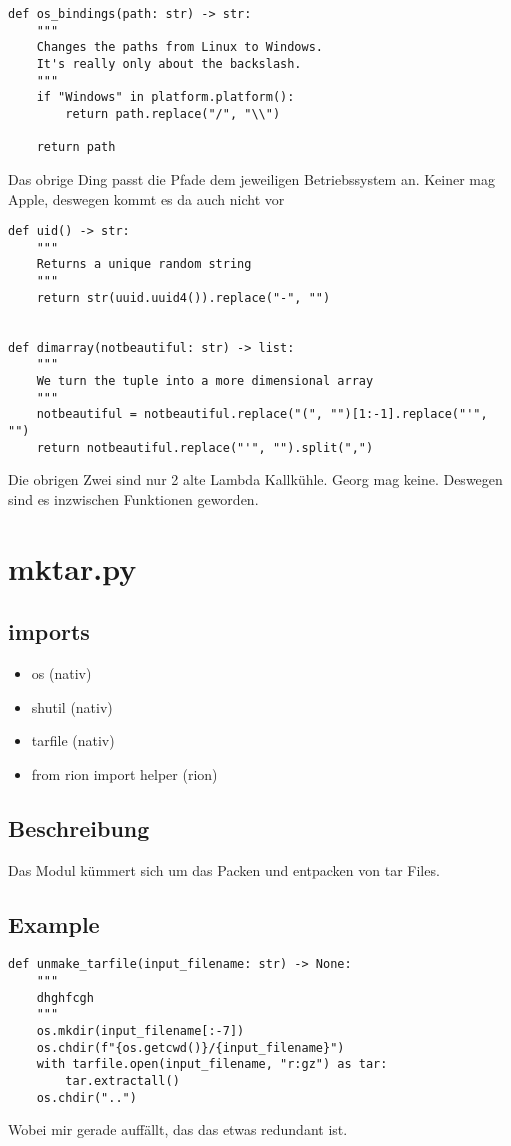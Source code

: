 \documentclass[fleqn,10pt]{olplainarticle}
\begin{document}
\begin{lstlisting}
def os_bindings(path: str) -> str:
    """
    Changes the paths from Linux to Windows.
    It's really only about the backslash.
    """
    if "Windows" in platform.platform():
        return path.replace("/", "\\")

    return path

\end{lstlisting}
Das obrige Ding passt die Pfade dem jeweiligen Betriebssystem an. Keiner mag Apple, deswegen kommt es da auch nicht vor 

\begin{lstlisting}
def uid() -> str:
    """
    Returns a unique random string
    """
    return str(uuid.uuid4()).replace("-", "")


def dimarray(notbeautiful: str) -> list:
    """
    We turn the tuple into a more dimensional array
    """
    notbeautiful = notbeautiful.replace("(", "")[1:-1].replace("'", "")
    return notbeautiful.replace("'", "").split(",")
\end{lstlisting}

Die obrigen Zwei sind nur 2 alte Lambda Kallkühle. Georg mag keine. Deswegen sind es inzwischen Funktionen geworden.

\section{mktar.py}
\subsection{imports}
\begin{itemize}
    \item os (nativ)
    \item shutil (nativ)
    \item tarfile  (nativ)
    \item from rion import helper (rion)
\end{itemize}
\subsection{Beschreibung}
Das Modul kümmert sich um das Packen und entpacken von tar Files. 
\subsection{Example}
\begin{lstlisting}
def unmake_tarfile(input_filename: str) -> None:
    """
    dhghfcgh
    """
    os.mkdir(input_filename[:-7])
    os.chdir(f"{os.getcwd()}/{input_filename}")
    with tarfile.open(input_filename, "r:gz") as tar:
        tar.extractall()
    os.chdir("..")
\end{lstlisting}
Wobei mir gerade auffällt, das das etwas redundant ist. 
\end{document}
